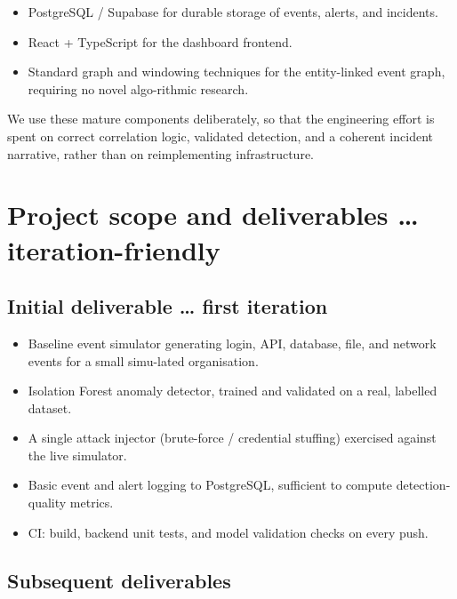\documentclass[12pt]{article}
\begin{document}
\begin{itemize}
  \item PostgreSQL / Supabase for durable storage of events, alerts, and incidents.
  \item React + TypeScript for the dashboard frontend.
  \item Standard graph and windowing techniques for the entity-linked event graph, requiring no novel algo-rithmic research.
\end{itemize}

We use these mature components deliberately, so that the engineering effort is spent on correct correlation logic, validated detection, and a coherent incident narrative, rather than on reimplementing infrastructure.

\section{Project scope and deliverables \ldots{} iteration-friendly}

\subsection{Initial deliverable \ldots{} first iteration}

\begin{itemize}
  \item Baseline event simulator generating login, API, database, file, and network events for a small simu-lated organisation.
  \item Isolation Forest anomaly detector, trained and validated on a real, labelled dataset.
  \item A single attack injector (brute-force / credential stuffing) exercised against the live simulator.
  \item Basic event and alert logging to PostgreSQL, sufficient to compute detection-quality metrics.
  \item CI: build, backend unit tests, and model validation checks on every push.
\end{itemize}

\subsection{Subsequent deliverables}
\end{document}
